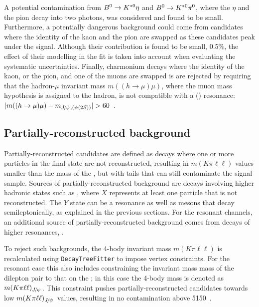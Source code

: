 A potential contamination from $\Bz \to\Kstarz\eta$ and $\Bz \to\Kstarz\pi^0$, where the $\eta$ and the pion decay into
two photons, was considered and found to be small.
Furthermore, a potentially dangerous background could come from candidates where the
identity of the kaon and the pion are swapped as these candidates peak under the signal.
Although their contribution is found to be small, 0.5\%, the effect of their modelling in the fit
is taken into account when evaluating the systematic uncertainties. Finally, charmonium decays where 
the identity of the kaon, or the pion, and one of the muons  are swapped is are rejected by requiring that the 
hadron-$\mu$ invariant mass $m((h \to \mu)\mu)$, where the muon mass hypothesis is assigned to the hadron, 
is not compatible with a \jpsi (\psitwos) resonance: $|m((h\to \mu)\mu)-m_{\jpsi, (\psitwos)} | > 60$~\mevcc.

\subsection{Partially-reconstructed background}
\label{sec:RKst_peaking_Dchains}

Partially-reconstructed candidates are defined as decays where one or more particles in the final state are not reconstructed,
resulting in $m(K\pi\ell\ell)$ values smaller than the mass of the \Bz, but with tails that can still contaminate the signal sample.
Sources of partially-reconstructed background are decays involving higher hadronic states such as 
, where $X$ represents at least one particle that is not reconstructed. 
The $Y$ state can be a \Kstar resonance as well as \D mesons that decay semileptonically, as explained in the previous sections.
For the resonant channels, an additional source of partially-reconstructed 
background comes from decays of higher \ccbar resonances, .

To reject such backgrounds, the 4-body invariant mass $m(K\pi\ell\ell)$ is recalculated using 
\verb!DecayTreeFitter! to impose vertex constraints. For the resonant case this also includes constraining the invariant mass 
mass of the dilepton pair to that on the \jpsi; in this case the 4-body mass is denoted as $m(K\pi\ell\ell)_{\jpsi}$. This constraint 
pushes partially-reconstructed candidates towards low $m(K\pi\ell\ell)_{\jpsi}$ values, resulting in no contamination above 5150~\mevcc. 

